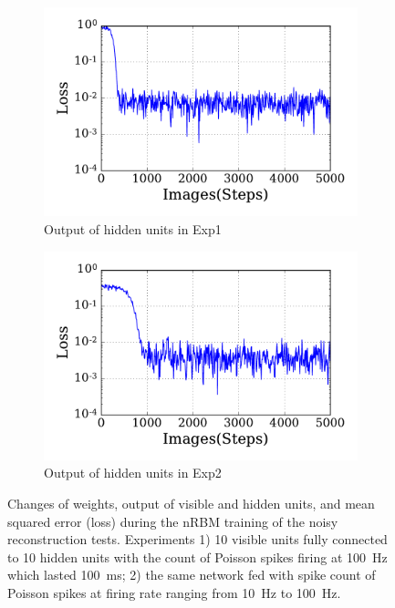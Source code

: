 \begin{figure}
\begin{subfigure}[t]{0.48\textwidth}
		\DIFaddendFL \includegraphics[width=\textwidth]{pics_sdlm/31_exp_RBM_noise/exp1_loss_s.pdf}
		\caption{Output of hidden units in Exp1}
	\end{subfigure}
	\DIFdelbeginFL %
\DIFdelendFL \DIFaddbeginFL \begin{subfigure}[t]{0.48\textwidth}
		\DIFaddendFL \includegraphics[width=\textwidth]{pics_sdlm/31_exp_RBM_noise/exp2_loss_s.pdf}
		\caption{Output of hidden units in Exp2}
	\end{subfigure}
	\DIFdelbeginFL %
\DIFdelendFL \DIFaddbeginFL \caption[nRBM training of the reconstruction tests given noisy data.]{\DIFaddendFL Changes of weights, output of visible and hidden units, and mean squared error (loss) during the nRBM training of the noisy reconstruction tests. 
		Experiments 1) 10 visible units fully connected to 10 hidden units with the count of Poisson spikes firing at 100~Hz which lasted 100~ms; 2) the same network fed with spike count of Poisson spikes at firing rate ranging from 10~Hz to 100~Hz.}
	\label{fig:rbm_noise}
\end{figure}

